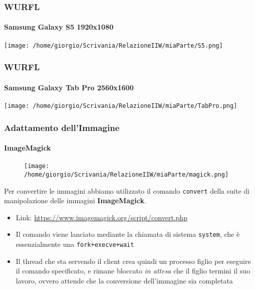 \documentclass{beamer}
\begin{document}
\begin{frame}
\frametitle{WURFL}
\framesubtitle{Samsung Galaxy S5 1920x1080}


\texttt{[image: /home/giorgio/Scrivania/RelazioneIIW/miaParte/S5.png]}



\end{frame}


\begin{frame}
\frametitle{WURFL}
\framesubtitle{Samsung Galaxy Tab Pro 2560x1600}


\texttt{[image: /home/giorgio/Scrivania/RelazioneIIW/miaParte/TabPro.png]}



\end{frame}



\begin{frame}
\frametitle{Adattamento dell'Immagine}
\framesubtitle{ImageMagick}
\begin{figure}
    \texttt{[image: /home/giorgio/Scrivania/RelazioneIIW/miaParte/magick.png]}
\end{figure}

Per convertire le immagini abbiamo utilizzato il comando \texttt{convert} della suite di manipolazione delle immagini \textbf{ImageMagick}.
\begin{itemize}
\item Link: \href{https://www.imagemagick.org/script/convert.php}{\color{blue}  https://www.imagemagick.org/script/convert.php} 
\item Il comando viene lanciato mediante la chiamata di sistema \texttt{system}, che è essenzialmente una \texttt{fork+execve+wait}
\item Il thread che sta servendo il client crea quindi un processo figlio per eseguire il comando specificato, e rimane bloccato \textit{in attesa} che il figlio termini il suo lavoro, ovvero attende che la conversione dell'immagine sia completata
\end{itemize}
\end{frame}
\end{document}
